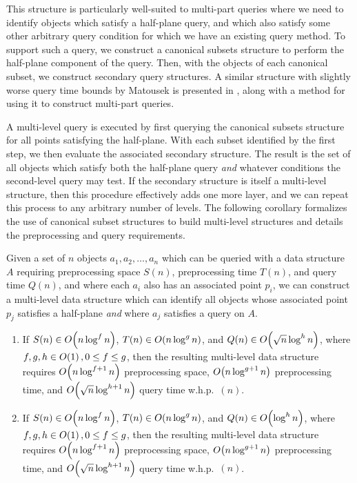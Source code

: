 This structure is particularly well-suited to multi-part queries where we need to identify objects which satisfy a half-plane query, and which also satisfy some other arbitrary query condition for which we have an existing query method.
To support such a query, we construct a canonical subsets structure to perform the half-plane component of the query. 
Then, with the objects of each canonical subset, we construct secondary query structures.
A similar structure with slightly worse query time bounds by Matousek\cite{Matousek92} is presented in \cite[Chapter~16]{Deberg}, along with a method for using it to construct multi-part queries.

A multi-level query is executed by first querying the canonical subsets structure for all points satisfying the half-plane.
With each subset identified by the first step, we then evaluate the associated secondary structure.
The result is the set of all objects which satisfy both the half-plane query \emph{and} whatever conditions the second-level query may test.
If the secondary structure is itself a multi-level structure, then this procedure effectively adds one more layer, and we can repeat this process to any arbitrary number of levels.
The following corollary formalizes the use of canonical subset structures to build multi-level structures and details the preprocessing and query requirements.


\begin{corollary}
\label{cor:multichan}

Given a set of $n$ objects $a_1, a_2, \ldots, a_n$ which can be queried with a data structure $A$ requiring preprocessing space $S(n)$, preprocessing time $T(n)$, and query time $Q(n)$, and where each $a_i$ also has an associated point $p_i$, we can construct a multi-level data structure which can identify all objects whose associated point $p_j$ satisfies a half-plane  \emph{and} where $a_j$ satisfies a query on $A$.

\begin{enumerate}
\item If $S(n) \in O\!\left(n \log^f{n}\right)$, $T(n) \in O\!\left(n \log^g{n}\right)$, and $Q(n) \in O\!\left(\sqrt{n} \log^h{n}\right)$, where $f, g, h \in O\!\left(1\right), 0 \leq f \leq g$, then the resulting multi-level data structure requires $O\!\left(n\log^{f+1}{n}\right)$ preprocessing space, $O\!\left(n\log^{g+1}{n}\right)$ preprocessing time, and $O\!\left(\sqrt{n}\log^{h+1}{n}\right)$ query time w.h.p.~$(n)$.

\item If $S(n) \in O\!\left(n \log^f{n}\right)$, $T(n) \in O\!\left(n \log^g{n}\right)$, and $Q(n) \in O\!\left(\log^h{n}\right)$, where $f, g, h \in O\!\left(1\right), 0 \leq f \leq g$, then the resulting multi-level data structure requires $O\!\left(n\log^{f+1}{n}\right)$ preprocessing space, $O\!\left(n\log^{g+1}{n}\right)$ preprocessing time, and $O\!\left(\sqrt{n}\log^{h+1}{n}\right)$ query time w.h.p.~$(n)$.

\end{enumerate}
\end{corollary}

